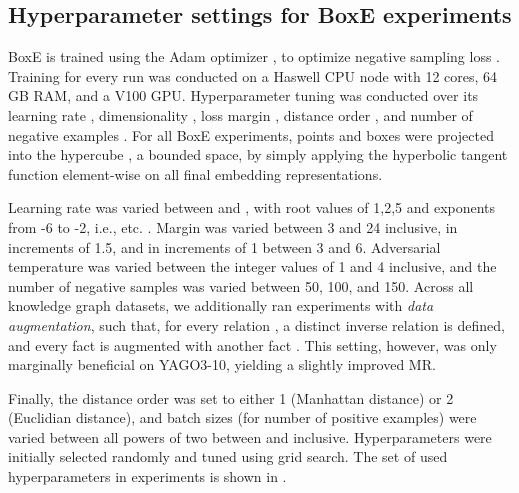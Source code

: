 \documentclass{article}
\begin{document}
\subsection{Hyperparameter settings for BoxE experiments}
BoxE is trained using the Adam optimizer \cite{Kingma-ICLR2014}, to optimize negative sampling loss \cite{RotatE-ICLR19}. Training for every run was conducted on a Haswell CPU node with 12 cores, 64 GB RAM, and a V100 GPU. Hyperparameter tuning was conducted over its learning rate , dimensionality , loss margin , distance order , and number of negative examples . For all BoxE experiments, points and boxes were projected into the hypercube , a bounded space, by simply applying the hyperbolic tangent function  element-wise on all final embedding representations. 

Learning rate was varied between  and , with root values of 1,2,5 and exponents from -6 to -2, i.e.,  etc. .
Margin was varied between 3 and 24 inclusive, in increments of 1.5, and in increments of 1 between 3 and 6. Adversarial temperature was varied between the integer values of 1 and 4 inclusive, and the number of negative samples was varied between 50, 100, and 150. 
Across all knowledge graph datasets, we additionally ran experiments with \emph{data augmentation}, such that, for every relation , a distinct inverse relation  is defined, and every fact  is augmented with another fact . This setting, however, was only marginally beneficial on YAGO3-10, yielding a slightly improved MR. 

Finally, the distance order was set to either 1 (Manhattan distance) or 2 (Euclidian distance), and batch sizes (for number of positive examples) were varied between all powers of two between  and  inclusive. Hyperparameters were initially selected randomly and tuned using grid search. The set of used hyperparameters in experiments is shown in . 
\end{document}
